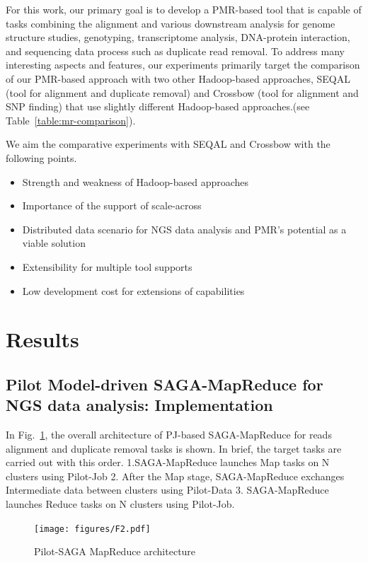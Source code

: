 \documentclass{sig-alternate}
\begin{document}
For this work, our primary goal is to develop a PMR-based tool that is capable of tasks combining the alignment and various downstream analysis for genome structure studies, genotyping, transcriptome analysis, DNA-protein interaction, and sequencing data process such as duplicate read removal.  To address many interesting aspects and features, our experiments primarily target the comparison of our PMR-based approach with two other Hadoop-based approaches, SEQAL (tool for alignment and duplicate removal) and Crossbow (tool for alignment and SNP finding) that use slightly different Hadoop-based approaches.(see Table~\ref{table:mr-comparison}).  

We aim the comparative experiments with SEQAL and Crossbow with the following points.
\begin{itemize}
\item Strength and weakness of Hadoop-based approaches
\item Importance of the support of scale-across 
\item Distributed data scenario for NGS data analysis and PMR's potential as a viable solution
\item Extensibility for multiple tool supports
\item Low development cost for extensions of capabilities
\end{itemize}





\section{Results}

\subsection{Pilot Model-driven SAGA-MapReduce for NGS data analysis: Implementation}
In Fig.~\ref{fig:arch-pj-saga-mr}, the overall architecture of PJ-based SAGA-MapReduce for reads alignment and duplicate removal tasks is shown.  In brief, the target tasks are carried out with this order. 1.SAGA-MapReduce launches Map tasks on N clusters using Pilot-Job 2. After the Map stage, SAGA-MapReduce exchanges Intermediate data between clusters using Pilot-Data  3. SAGA-MapReduce launches Reduce tasks on N clusters using Pilot-Job.


\begin{figure}
 \centering
\texttt{[image: figures/F2.pdf]} 
\caption{\small Pilot-SAGA MapReduce architecture}
  \label{fig:arch-pj-saga-mr} 
\end{figure}
\end{document}
